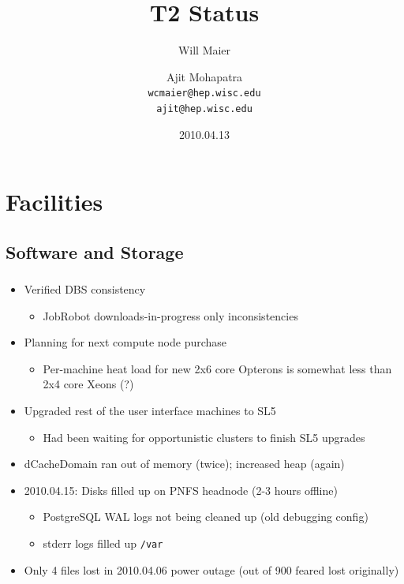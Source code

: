 \documentclass{beamer}
\title{T2 Status}
\author[Maier, Mohapatra]{
    Will Maier \and Ajit Mohapatra\\
    {\tt wcmaier@hep.wisc.edu}\\
    {\tt ajit@hep.wisc.edu}}
\institute[Wisconsin]{University of Wisconsin - High Energy Physics}
\date{2010.04.13}
\begin{document}
\begin{frame}
    \titlepage
\end{frame}


\section{Facilities}
\subsection{Software and Storage}
\begin{frame}
\frametitle{}

\begin{itemize}
	\item Verified DBS consistency
	\begin{itemize}
		\item JobRobot downloads-in-progress only inconsistencies
	\end{itemize}
	\item Planning for next compute node purchase
	\begin{itemize}
		\item Per-machine heat load for new 2x6 core Opterons is somewhat less than 2x4 core Xeons (?)
	\end{itemize}
	\item Upgraded rest of the user interface machines to SL5
	\begin{itemize}
		\item Had been waiting for opportunistic clusters to finish SL5 upgrades
	\end{itemize}
	\item dCacheDomain ran out of memory (twice); increased heap (again)
	\item 2010.04.15: Disks filled up on PNFS headnode (2-3 hours offline)
	\begin{itemize}
		\item PostgreSQL WAL logs not being cleaned up (old debugging config)
		\item stderr logs filled up {\tt /var}
	\end{itemize}
	\item Only 4 files lost in 2010.04.06 power outage (out of 900 feared lost originally)
\end{itemize}
\end{frame}
\end{document}
